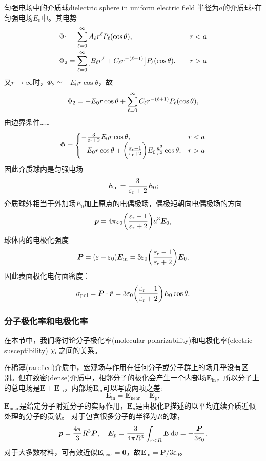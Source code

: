 \begin{example}{匀强电场中的介质球}{dielectric sphere in uniform electric field}
    半径为$a$的介质球$\varepsilon$在匀强电场$E_0$中。其电势
    \begin{alignat*}{2}
        \Phi_1&=\sum_{\ell=0}^{\infty}A_\ell r^\ell P_\ell(\cos\theta),&\quad&r<a\\
        \Phi_2&=\sum_{\ell=0}^{\infty}\bigl[B_\ell r^\ell+C_\ell r^{-(\ell+1)}\bigr]P_\ell(\cos\theta),&&r>a
    \end{alignat*}
    又$r\to\infty$时，$\Phi_2\simeq -E_0r\cos\theta$，故 
    \[
        \Phi_2=-E_0r\cos\theta+\sum_{\ell=0}^{\infty}C_\ell r^{-(\ell+1)}P_\ell(\cos\theta),
    \]
    由边界条件……
    \[
        \Phi=\begin{cases}
            -\frac{3}{\varepsilon_\text r+2}E_0r\cos\theta,&r<a\\
            -E_0r\cos\theta+\biggl(\frac{\varepsilon_\text r-1}{\varepsilon_\text r+2}\biggr)E_0\frac{a^3}{r^2}\cos\theta,&r>a
        \end{cases}
    \]
    因此介质球内是匀强电场
    \[
        E_\text{in}=\frac{3}{\varepsilon_\text r+2}E_0;
    \]
    介质球外相当于外加场$E_0$加上原点的电偶极场，偶极矩朝向电偶极场的方向
    \[
        \bm p=4\pi\varepsilon_0\biggl(\frac{\varepsilon_\text r-1}{\varepsilon_\text r+2}\biggr)a^3\bm E_0,
    \]
    球体内的电极化强度
    \begin{equation}
        \label{eqn:P-E}
        \bm P=(\varepsilon-\varepsilon_0)\bm E_\text{in}=3\varepsilon_0\biggl(\frac{\varepsilon_\text r-1}{\varepsilon_\text r+2}\biggr)\bm E_0,
    \end{equation}
    因此表面极化电荷面密度：
    \[
        \sigma_\text{pol}=\bm P\cdot\mathop{}\!\hat{\bm r}=3\varepsilon_0\biggl(\frac{\varepsilon_\text r-1}{\varepsilon_\text r+2}\biggr)E_0\cos\theta.
    \]
\end{example}
\subsubsection{分子极化率和电极化率}
在本节中，我们将讨论分子极化率(molecular polarizability)和电极化率(electric susceptibility) $\chi_\mathrm e$之间的关系。%

在稀薄(rarefied)介质中，宏观场与作用在任何分子或分子群上的场几乎没有区别。但在致密(dense)介质中，相邻分子的极化会产生一个内部场$\bm E_\text{in}$，所以分子上的总电场是$\bm E+\bm E_\text{in}$，内部场$\bm E_\text{in}$可以写成两项之差:
\[
    \bm E_\text{in}=\bm E_\text{near}-\bm E_p,
\]
$\bm E_\text{near}$是给定分子附近分子的实际作用，$\bm E_p$是由极化$\bm P$描述的以平均连续介质近似处理的分子的贡献。
对于包含很多分子的半径为$R$的球， 
\[
    \bm p=\frac{4\pi}3R^3\bm P,\quad \bm E_p=\frac3{4\pi R^3}\int_{r<R}\bm E\mathop{}\!\mathrm{d} v=-\frac{\bm P}{3\varepsilon_0}.
\]
对于大多数材料，可有效近似$\bm E_\text{near}=\bm 0$，故$\bm E_\text{in}=\bm P/3\varepsilon_0$。

